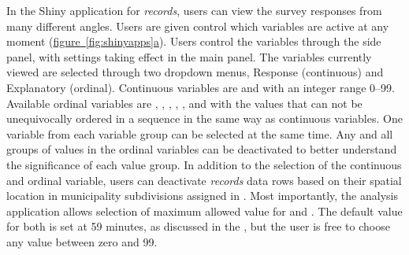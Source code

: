 In the Shiny application for \textit{records}, users can view the survey responses from many different angles. Users are given control which variables are active at any moment (\hyperref[fig:shinyapps]{figure~\ref{fig:shinyapps}a}). Users control the variables through the side panel, with settings taking effect in the main panel. The variables currently viewed are selected through two dropdown menus, Response (continuous) and Explanatory (ordinal). Continuous variables are  and  with an integer range 0--99. Available ordinal variables are , , , , , and  with the values that can not be unequivocally ordered in a sequence in the same way as continuous variables. One variable from each variable group can be selected at the same time. Any and all groups of values in the ordinal variables can be deactivated to better understand the significance of each value group. In addition to the selection of the continuous and ordinal variable, users can deactivate \textit{records} data rows based on their spatial location in municipality subdivisions assigned in \hyperref[sec:c3-processdata]{}. Most importantly, the analysis application allows selection of maximum allowed value for  and . The default value for both is set at 59 minutes, as discussed in the , but the user is free to choose any value between zero and 99.

